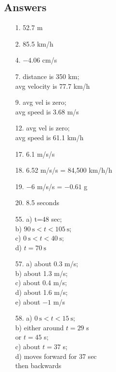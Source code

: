 \documentclass[10pt]{exam}
\begin{document}

\subsection*{Answers}

\begin{multicols}{3}

  \begin{itemize}[noitemsep]
    \item[1.]  52.7 m
    \item[2.]  85.5 km/h
    \item[4.]  $-4.06$ cm/s
    \item[7.]  distance is 350 km; \\
               avg velocity is 77.7 km/h
    \item[9.]  avg vel is zero; \\
               avg speed is 3.68 m/s
    \item[12.] avg vel is zero; \\
               avg speed is 61.1 km/h
    \item[17.] 6.1 m/s/s
    \item[18.] 6.52 m/s/s = 84,500 km/h/h
    \item[19.] $-6$ m/s/s = $-0.61$ g
    \item[20.] 8.5 seconds
    \item[55.] a) t=48 sec;  \\ 
               b) $\SI{90}{\second} < t < \SI{105}{\second}$; \\
               c) $\SI{0}{\second} < t < \SI{40}{\second}$; \\
               d) $t=\SI{70}{\second}$
    \item[57.] a) about 0.3 m/s;  \\
               b) about 1.3 m/s;  \\
               c) about 0.4 m/s;  \\
               d) about 1.6 m/s;  \\ 
               e) about $-1$ m/s
    \item[58.] a) $\SI{0}{\second} < t < \SI{15}{\second}$;  \\
               b) either around $t=29$ s \\ \hspace*{5em}  or $t=45$ s; \\
               c) about $t=37$ s; \\
               d) moves forward for 37 sec \\ \hspace*{5em} then backwards
  \end{itemize}
  
\end{multicols}
\end{document}
